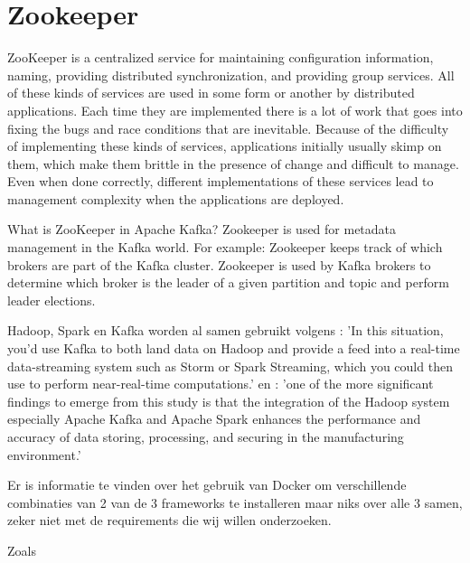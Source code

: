\section{Zookeeper}
\begin{Zookeeper}
    ZooKeeper is a centralized service for maintaining configuration information, naming, providing distributed synchronization, and providing group services. All of these kinds of services are used in some form or another by distributed applications. Each time they are implemented there is a lot of work that goes into fixing the bugs and race conditions that are inevitable. Because of the difficulty of implementing these kinds of services, applications initially usually skimp on them, which make them brittle in the presence of change and difficult to manage. Even when done correctly, different implementations of these services lead to management complexity when the applications are deployed.\autocite{ASF2023}
    
    What is ZooKeeper in Apache Kafka?
    Zookeeper is used for metadata management in the Kafka world. For example: Zookeeper keeps track of which brokers are part of the Kafka cluster. Zookeeper is used by Kafka brokers to determine which broker is the leader of a given partition and topic and perform leader elections. \autocite{Conduktor2023}
\end{Zookeeper}


Hadoop, Spark en Kafka worden al samen gebruikt volgens \textcite{Holmes2012}:
'In this situation, you'd use Kafka to both land data on Hadoop and provide a feed into a real-time data-streaming system such as Storm or Spark Streaming, which you could then use to perform near-real-time computations.' en \textcite{Leang2019}:
'one of the more significant findings to emerge from this study is that the integration of the Hadoop system especially Apache Kafka and Apache Spark enhances the performance and accuracy of data storing, processing, and securing in the manufacturing environment.'

Er is informatie te vinden over het gebruik van Docker om verschillende combinaties van 2 van de 3 frameworks te installeren maar niks over alle 3 samen, zeker niet met de requirements die wij willen onderzoeken. 

Zoals